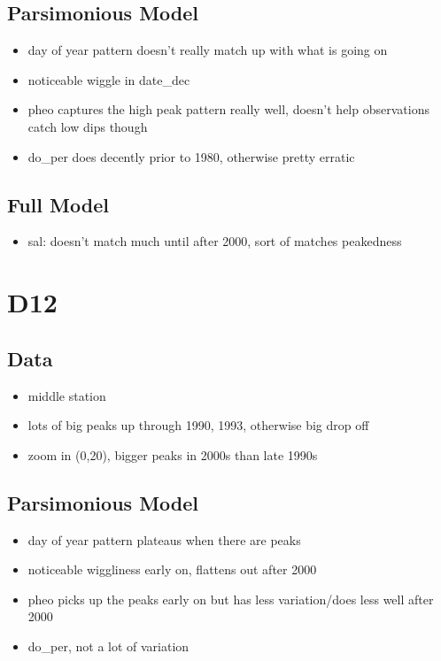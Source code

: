 \documentclass[12pt]{amsart}
\begin{document}
\subsection{Parsimonious Model}
\begin{itemize}
\item day of year pattern doesn't really match up with what is going on
\item noticeable wiggle in date_dec
\item pheo captures the high peak pattern really well, doesn't help observations catch low dips though
\item do_per does decently prior to 1980, otherwise pretty erratic
\end{itemize}
\subsection{Full Model}
\begin{itemize}
\item sal: doesn't match much until after 2000, sort of matches peakedness
\end{itemize}


\section{D12}
\subsection{Data}
\begin{itemize}
\item middle station
\item lots of big peaks up through 1990, 1993, otherwise big drop off
\item zoom in (0,20), bigger peaks in 2000s than late 1990s
\end{itemize}
\subsection{Parsimonious Model}
\begin{itemize}
\item day of year pattern plateaus when there are peaks
\item noticeable wiggliness early on, flattens out after 2000
\item pheo picks up the peaks early on but has less variation/does less well after 2000
\item do_per, not a lot of variation
\end{itemize}
\end{document}
